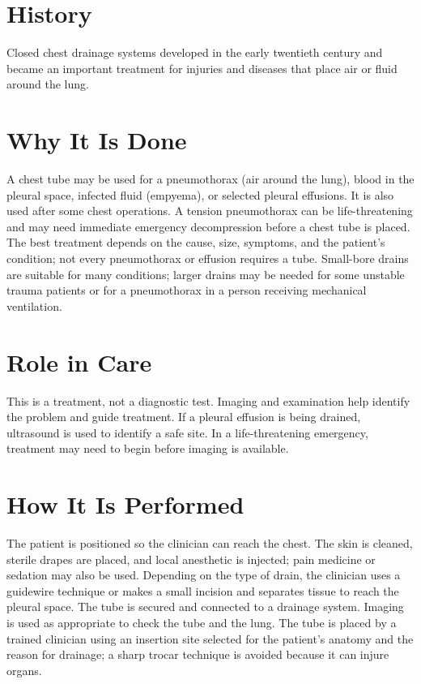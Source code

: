 \section*{History}
Closed chest drainage systems developed in the early twentieth century and became an important treatment for injuries and diseases that place air or fluid around the lung.

\section*{Why It Is Done}
A chest tube may be used for a pneumothorax (air around the lung), blood in the pleural space, infected fluid (empyema), or selected pleural effusions. It is also used after some chest operations. A tension pneumothorax can be life-threatening and may need immediate emergency decompression before a chest tube is placed. The best treatment depends on the cause, size, symptoms, and the patient's condition; not every pneumothorax or effusion requires a tube. Small-bore drains are suitable for many conditions; larger drains may be needed for some unstable trauma patients or for a pneumothorax in a person receiving mechanical ventilation.

\section*{Role in Care}
This is a treatment, not a diagnostic test. Imaging and examination help identify the problem and guide treatment. If a pleural effusion is being drained, ultrasound is used to identify a safe site. In a life-threatening emergency, treatment may need to begin before imaging is available.

\section*{How It Is Performed}
The patient is positioned so the clinician can reach the chest. The skin is cleaned, sterile drapes are placed, and local anesthetic is injected; pain medicine or sedation may also be used. Depending on the type of drain, the clinician uses a guidewire technique or makes a small incision and separates tissue to reach the pleural space. The tube is secured and connected to a drainage system. Imaging is used as appropriate to check the tube and the lung. The tube is placed by a trained clinician using an insertion site selected for the patient's anatomy and the reason for drainage; a sharp trocar technique is avoided because it can injure organs.

